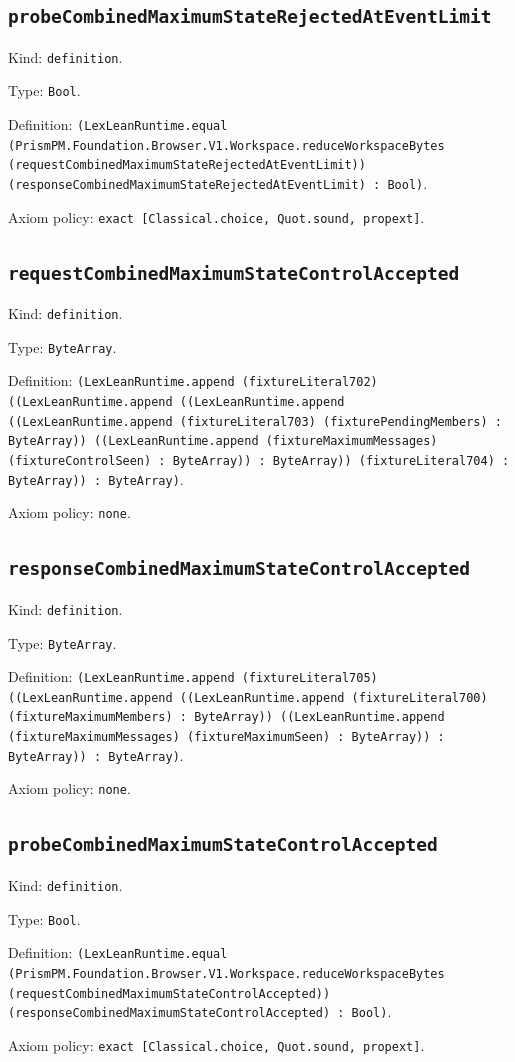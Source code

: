 \documentclass[11pt]{article}
\begin{document}
\subsection*{\texttt{probeCombinedMaximumStateRejectedAtEventLimit}}
\noindent Kind: \texttt{definition}.\par
\noindent Type: \texttt{Bool}.\par
\noindent Definition: \texttt{(LexLeanRuntime.equal (PrismPM.Foundation.Browser.V1.Workspace.reduceWorkspaceBytes (requestCombinedMaximumStateRejectedAtEventLimit)) (responseCombinedMaximumStateRejectedAtEventLimit) : Bool)}.\par
\noindent Axiom policy: \texttt{exact [Classical.choice, Quot.sound, propext]}.\par
\subsection*{\texttt{requestCombinedMaximumStateControlAccepted}}
\noindent Kind: \texttt{definition}.\par
\noindent Type: \texttt{ByteArray}.\par
\noindent Definition: \texttt{(LexLeanRuntime.append (fixtureLiteral702) ((LexLeanRuntime.append ((LexLeanRuntime.append ((LexLeanRuntime.append (fixtureLiteral703) (fixturePendingMembers) : ByteArray)) ((LexLeanRuntime.append (fixtureMaximumMessages) (fixtureControlSeen) : ByteArray)) : ByteArray)) (fixtureLiteral704) : ByteArray)) : ByteArray)}.\par
\noindent Axiom policy: \texttt{none}.\par
\subsection*{\texttt{responseCombinedMaximumStateControlAccepted}}
\noindent Kind: \texttt{definition}.\par
\noindent Type: \texttt{ByteArray}.\par
\noindent Definition: \texttt{(LexLeanRuntime.append (fixtureLiteral705) ((LexLeanRuntime.append ((LexLeanRuntime.append (fixtureLiteral700) (fixtureMaximumMembers) : ByteArray)) ((LexLeanRuntime.append (fixtureMaximumMessages) (fixtureMaximumSeen) : ByteArray)) : ByteArray)) : ByteArray)}.\par
\noindent Axiom policy: \texttt{none}.\par
\subsection*{\texttt{probeCombinedMaximumStateControlAccepted}}
\noindent Kind: \texttt{definition}.\par
\noindent Type: \texttt{Bool}.\par
\noindent Definition: \texttt{(LexLeanRuntime.equal (PrismPM.Foundation.Browser.V1.Workspace.reduceWorkspaceBytes (requestCombinedMaximumStateControlAccepted)) (responseCombinedMaximumStateControlAccepted) : Bool)}.\par
\noindent Axiom policy: \texttt{exact [Classical.choice, Quot.sound, propext]}.\par
\end{document}
